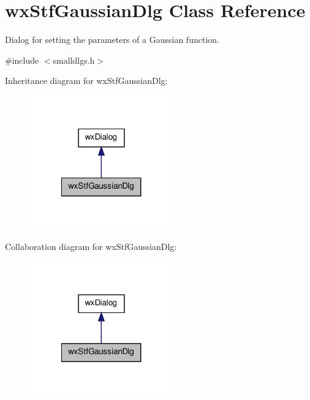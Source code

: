 \hypertarget{classwxStfGaussianDlg}{
\section{wxStfGaussianDlg Class Reference}
\label{classwxStfGaussianDlg}
}


Dialog for setting the parameters of a Gaussian function.  




{\ttfamily \#include $<$smalldlgs.h$>$}



Inheritance diagram for wxStfGaussianDlg:
\nopagebreak
\begin{figure}[H]
\begin{center}
\leavevmode
\includegraphics[width=176pt]{classwxStfGaussianDlg__inherit__graph}
\end{center}
\end{figure}


Collaboration diagram for wxStfGaussianDlg:
\nopagebreak
\begin{figure}[H]
\begin{center}
\leavevmode
\includegraphics[width=176pt]{classwxStfGaussianDlg__coll__graph}
\end{center}
\end{figure}
